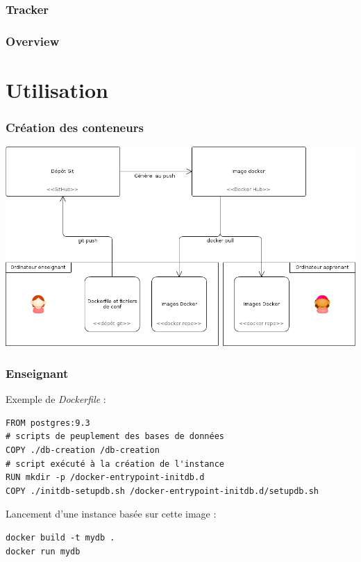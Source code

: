 \documentclass[10pt, compress]{beamer}
\begin{document}
\begin{frame}[fragile]
  \frametitle{Tracker}
  \begin{center}

   \end{center}
\end{frame}

\begin{frame}[fragile]
  \frametitle{Overview}
  \begin{center}

   \end{center}
\end{frame}

\section{Utilisation}

\begin{frame}[fragile]
  \frametitle{Création des conteneurs}
  \begin{center}
  \includegraphics[scale = 0.35]{infrastructure-creation.png}
   \end{center}
\end{frame}

\begin{frame}[fragile]
  \frametitle{Enseignant}

  Exemple de \emph{Dockerfile} :

  \begin{verbatim}
FROM postgres:9.3
# scripts de peuplement des bases de données
COPY ./db-creation /db-creation
# script exécuté à la création de l'instance
RUN mkdir -p /docker-entrypoint-initdb.d
COPY ./initdb-setupdb.sh /docker-entrypoint-initdb.d/setupdb.sh
  \end{verbatim}
  
  Lancement d'une instance basée sur cette image :
  
  \begin{verbatim}
docker build -t mydb .
docker run mydb
  \end{verbatim}
\end{frame}
\end{document}
